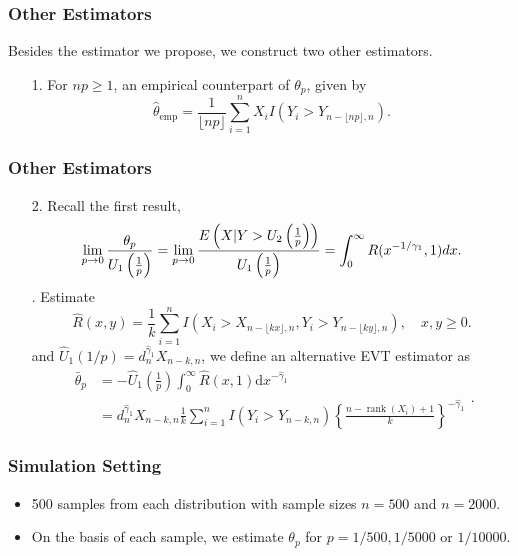\documentclass{beamer}
\begin{document}
\begin{frame}
    \frametitle{Other Estimators}
Besides the estimator we propose, we construct two other estimators.
\begin{itemize}
    \item[1.]  For $np\ge 1$,  an empirical counterpart of $\theta_p$, given by
    $$
    \hat{\theta}_{\mathrm{emp}}=\frac{1}{\lfloor n p\rfloor} \sum_{i=1}^{n} X_{i} I\left(Y_{i}>Y_{n-\lfloor n p\rfloor, n}\right).
    $$
\end{itemize}
\end{frame}
\begin{frame}
    \frametitle{Other Estimators}

\begin{itemize}
    \item[2.] Recall the first result,
    $$
\lim_{p\to 0} \frac{\theta_p}{U_1\left(\frac{1}{p}\right)} = \lim_{p\to 0} \frac{E\left(X|Y>U_2\left(\frac{1}{p}\right)\right)}{U_1\left(\frac{1}{p}\right)} = \int_0^{\infty} R(x^{-1/\gamma_1},1)dx.
$$.
Estimate 
    $$
    \hat{R}(x, y)=\frac{1}{k} \sum_{i=1}^{n} I\left(X_{i}>X_{n-\lfloor k x\rfloor, n}, Y_{i}>Y_{n-\lfloor k y\rfloor, n}\right), \quad x, y \geqslant 0.
    $$
    and  $\hat{U}_{1}(1 / p)=d_{n}^{\hat{\gamma}_{1}} X_{n-k, n}$,  we define an
    alternative EVT estimator as
    $$
    \begin{aligned}
    \bar{\theta}_{p} &=-\hat{U}_{1}\left(\frac{1}{p}\right) \int_{0}^{\infty} \hat{R}(x, 1) \mathrm{d} x^{-\hat{\gamma}_{1}} \\
    &=d_{n}^{\hat{\gamma}_{1}} X_{n-k, n} \frac{1}{k} \sum_{i=1}^{n} I\left(Y_{i}>Y_{n-k, n}\right)\left\{\frac{n-\operatorname{rank}\left(X_{i}\right)+1}{k}\right\}^{-\hat{\gamma}_{1}}
    \end{aligned}.
    $$
\end{itemize}


\end{frame}

\begin{frame}
    \frametitle{Simulation Setting}
\begin{itemize}
    \item 500 samples from each distribution with sample sizes $n=500$ and $n=2000$.
    \item On the basis of each sample, we estimate $\theta_p$ for $p=1/500,1/5000$ or $1/10000$.
\end{itemize}
    

\end{frame}
\end{document}
